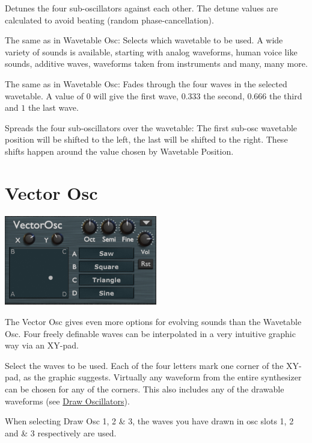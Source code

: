 {Detunes the four sub-oscillators against each other. The detune values are calculated to avoid beating (random phase-cancellation).}

{The same as in Wavetable Osc: Selects which wavetable to be used. A wide variety of sounds is available, starting with analog waveforms, human voice like sounds, additive waves, waveforms taken from instruments and many, many more.}

{The same as in Wavetable Osc: Fades through the four waves in the selected wavetable. A value of $0$ will give the first wave, $0.333$ the second, $0.666$ the third and $1$ the last wave.}

{Spreads the four sub-oscillators over the wavetable: The first sub-osc wavetable position will be shifted to the left, the last will be shifted to the right. These shifts happen around the value chosen by Wavetable Position.}

\section{Vector Osc}
\begin{center}
    \includegraphics[width=0.5\textwidth]{graphics/vector_osc.png}
\end{center}
The Vector Osc gives even more options for evolving sounds than the Wavetable Osc. Four freely definable waves can be interpolated in a very intuitive graphic way via an XY-pad.

{Select the waves to be used. Each of the four letters mark one corner of the XY-pad, as the graphic suggests. Virtually any waveform from the entire synthesizer can be chosen for any of the corners. This also includes any of the drawable waveforms (see \hyperref[wavedraw]{Draw Oscillators}).

When selecting  Draw Osc 1, 2 \& 3, the waves you have drawn in osc slots 1, 2 and \& 3 respectively are used.}

